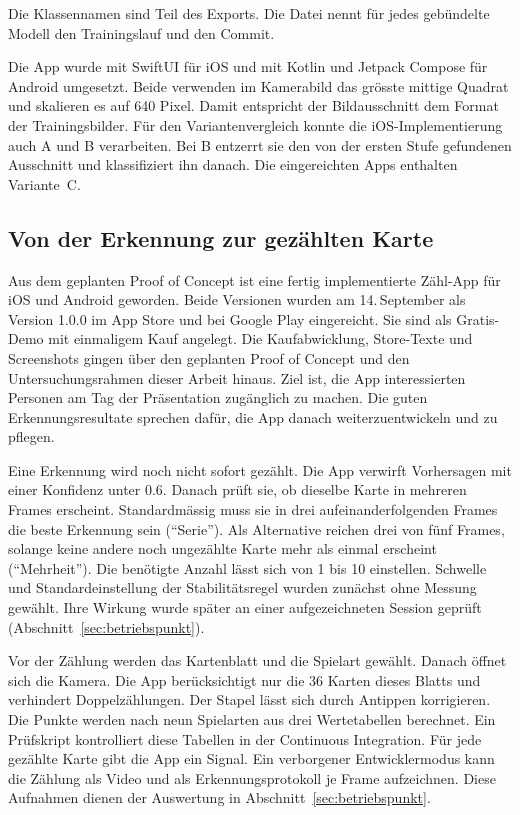 Die Klassennamen sind Teil des Exports. Die Datei 
nennt für jedes gebündelte Modell den Trainingslauf und den Commit.

Die App wurde mit SwiftUI für iOS und mit Kotlin und Jetpack Compose
für Android umgesetzt. Beide verwenden im Kamerabild das grösste
mittige Quadrat und skalieren es auf 640 Pixel. Damit entspricht
der Bildausschnitt dem Format der Trainingsbilder. Für den
Variantenvergleich konnte die iOS-Implementierung auch A und B
verarbeiten. Bei B entzerrt sie den von der ersten Stufe gefundenen
Ausschnitt und klassifiziert ihn danach. Die eingereichten Apps
enthalten Variante~C.

\subsection{Von der Erkennung zur gezählten Karte}\label{sec:zaehlung}

Aus dem geplanten Proof of Concept ist eine fertig implementierte
Zähl-App für iOS und Android geworden. Beide Versionen wurden am
14.\,September als Version 1.0.0 im App Store und bei Google Play
eingereicht. Sie sind als Gratis-Demo mit einmaligem Kauf angelegt.
Die Kaufabwicklung, Store-Texte und Screenshots gingen über den
geplanten Proof of Concept und den Untersuchungsrahmen dieser Arbeit
hinaus. Ziel ist, die App interessierten Personen am Tag der
Präsentation zugänglich zu machen. Die guten Erkennungsresultate
sprechen dafür, die App danach weiterzuentwickeln und zu pflegen.

Eine Erkennung wird noch nicht sofort gezählt. Die App verwirft
Vorhersagen mit einer Konfidenz unter 0.6. Danach prüft sie, ob
dieselbe Karte in mehreren Frames erscheint. Standardmässig muss
sie in drei aufeinanderfolgenden Frames die beste Erkennung sein
(\enquote{Serie}). Als Alternative reichen drei von fünf Frames,
solange keine andere noch ungezählte Karte mehr als einmal
erscheint (\enquote{Mehrheit}). Die benötigte Anzahl lässt sich
von 1 bis 10 einstellen. Schwelle und Standardeinstellung der
Stabilitätsregel wurden zunächst ohne Messung gewählt. Ihre
Wirkung wurde später an einer aufgezeichneten Session geprüft
(Abschnitt~\ref{sec:betriebspunkt}).

Vor der Zählung werden das Kartenblatt und die Spielart gewählt. Danach
öffnet sich die Kamera. Die App
berücksichtigt nur die 36 Karten dieses Blatts und verhindert
Doppelzählungen. Der Stapel lässt sich durch Antippen korrigieren.
Die Punkte werden nach neun Spielarten aus drei Wertetabellen
berechnet. Ein Prüfskript kontrolliert diese Tabellen in der
Continuous Integration.
Für jede gezählte Karte gibt die App ein Signal. Ein verborgener
Entwicklermodus kann die Zählung als Video und als
Erkennungsprotokoll je Frame aufzeichnen. Diese Aufnahmen dienen
der Auswertung in Abschnitt~\ref{sec:betriebspunkt}.
